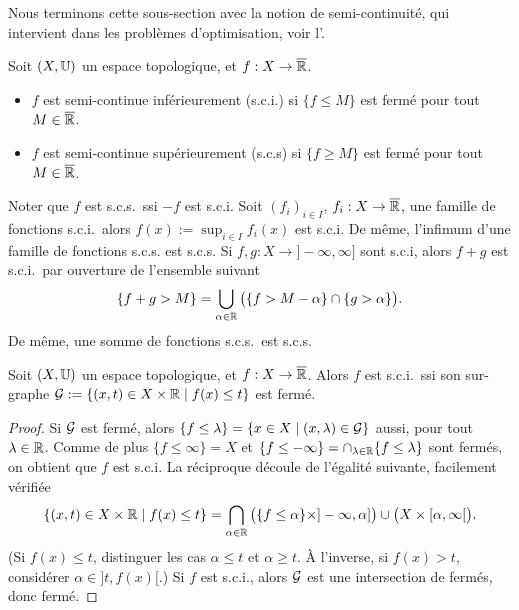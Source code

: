 Nous terminons cette sous-section avec la notion de semi-continuité, qui intervient dans les problèmes d'optimisation, voir  l'.

\begin{definition}
\label{def:semiContinuite}
%
	Soit $(X,\mathbb{U})$ un espace topologique, et $f : X \to \overline {\mathbb{R}}$. 
	\begin{itemize}
		\item $f$ est semi-continue inférieurement (s.c.i.) si $\{f \leq M\}$ est fermé pour tout $M \in \overline {\mathbb{R}}$.
		\item $f$ est semi-continue supérieurement (s.c.s) si $\{f \geq M\}$ est fermé pour tout $M \in \overline {\mathbb{R}}$. 
	\end{itemize}	
\end{definition}

Noter que $f$ est s.c.s.\ ssi $-f$ est s.c.i.
Soit $(f_i)_{i \in I}$, $f_i : X \to \overline {\mathbb{R}}$, une famille de fonctions s.c.i.\ alors $f(x) := \sup_{i \in I} f_i(x)$ est s.c.i. De même, l'infimum d'une famille de fonctions s.c.s. est s.c.s.
Si $f,g : X \to ]-\infty,\infty]$ sont s.c.i, alors $f+g$ est s.c.i.\ par ouverture de l'ensemble suivant
\begin{equation}
\label{eq:somme_sci}
	\{f+g>M\} = \bigcup_{\alpha \in \mathbb{R}} \big(\{f > M-\alpha\} \cap \{g > \alpha\}\big).
\end{equation}
De même, une somme de fonctions s.c.s.\ est s.c.s.


\begin{proposition}
\label{prop:surGrapheSCI}
	Soit $(X,\mathbb{U})$ un espace topologique, et $f : X \to \overline {\mathbb{R}}$. Alors $f$ est s.c.i.\ ssi son sur-graphe $\mathcal{G} := \{(x,t) \in X \times \mathbb{R} \mid f(x) \leq t\}$ est fermé. 
\end{proposition}

\begin{proof}
Si $\mathcal{G}$ est fermé, alors $\{f \leq \lambda\} = \{x\in X \mid (x,\lambda) \in \mathcal{G}\}$ aussi, pour tout $\lambda \in \mathbb{R}$. Comme de plus $\{f \leq \infty\} = X$ et $\{f \leq -\infty\} = \cap_{\lambda \in \mathbb{R}} \{f\leq \lambda\}$ sont fermés, on obtient que $f$ est s.c.i. La réciproque découle de l'égalité suivante, facilement vérifiée 
\begin{equation*}
	\{(x,t) \in X \times \mathbb{R} \mid f(x) \leq t\} 
	= \bigcap_{\alpha \in \mathbb{R}} \big(\{f \leq \alpha\} \times ]-\infty,\alpha]\big) \cup \big(X \times [\alpha, \infty[\big).
\end{equation*}
(Si $f(x)\leq t$, distinguer les cas $\alpha \leq t$ et $\alpha \geq t$. À l'inverse, si $f(x)>t$, considérer $\alpha \in ]t,f(x)[$.)
Si $f$ est s.c.i., alors $\mathcal{G}$ est une intersection de fermés, donc fermé. 
\end{proof}

